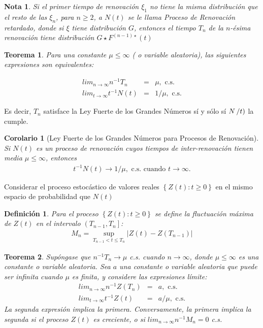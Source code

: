 \documentclass{article}
\newtheorem{Def}{Definición}[section]
\newtheorem{Teo}{Teorema}[section]
\newtheorem{Note}{Nota}[section]
\newtheorem{Coro}{Corolario}[section]
\numberwithin{equation}{section}
\begin{document}
\begin{Note}
Si el primer tiempo de renovaci\'on $\xi_{1}$ no tiene la misma distribuci\'on que el resto de las $\xi_{n}$, para $n\geq2$, a $N\left(t\right)$ se le llama Proceso de Renovaci\'on retardado, donde si $\xi$ tiene distribuci\'on $G$, entonces el tiempo $T_{n}$ de la $n$-\'esima renovaci\'on tiene distribuci\'on $G\star F^{\left(n-1\right)\star}\left(t\right)$
\end{Note}


\begin{Teo}
Para una constante $\mu\leq\infty$ ( o variable aleatoria), las siguientes expresiones son equivalentes:

\begin{eqnarray}
lim_{n\rightarrow\infty}n^{-1}T_{n}&=&\mu,\textrm{ c.s.}\\
lim_{t\rightarrow\infty}t^{-1}N\left(t\right)&=&1/\mu,\textrm{ c.s.}
\end{eqnarray}
\end{Teo}


Es decir, $T_{n}$ satisface la Ley Fuerte de los Grandes N\'umeros s\'i y s\'olo s\'i $N\left/t\right)$ la cumple.


\begin{Coro}[Ley Fuerte de los Grandes N\'umeros para Procesos de Renovaci\'on]
Si $N\left(t\right)$ es un proceso de renovaci\'on cuyos tiempos de inter-renovaci\'on tienen media $\mu\leq\infty$, entonces
\begin{eqnarray}
t^{-1}N\left(t\right)\rightarrow 1/\mu,\textrm{ c.s. cuando }t\rightarrow\infty.
\end{eqnarray}

\end{Coro}


Considerar el proceso estoc\'astico de valores reales $\left\{Z\left(t\right):t\geq0\right\}$ en el mismo espacio de probabilidad que $N\left(t\right)$

\begin{Def}
Para el proceso $\left\{Z\left(t\right):t\geq0\right\}$ se define la fluctuaci\'on m\'axima de $Z\left(t\right)$ en el intervalo $\left(T_{n-1},T_{n}\right]$:
\begin{eqnarray*}
M_{n}=\sup_{T_{n-1}<t\leq T_{n}}|Z\left(t\right)-Z\left(T_{n-1}\right)|
\end{eqnarray*}
\end{Def}

\begin{Teo}
Sup\'ongase que $n^{-1}T_{n}\rightarrow\mu$ c.s. cuando $n\rightarrow\infty$, donde $\mu\leq\infty$ es una constante o variable aleatoria. Sea $a$ una constante o variable aleatoria que puede ser infinita cuando $\mu$ es finita, y considere las expresiones l\'imite:
\begin{eqnarray}
lim_{n\rightarrow\infty}n^{-1}Z\left(T_{n}\right)&=&a,\textrm{ c.s.}\\
lim_{t\rightarrow\infty}t^{-1}Z\left(t\right)&=&a/\mu,\textrm{ c.s.}
\end{eqnarray}
La segunda expresi\'on implica la primera. Conversamente, la primera implica la segunda si el proceso $Z\left(t\right)$ es creciente, o si $lim_{n\rightarrow\infty}n^{-1}M_{n}=0$ c.s.
\end{Teo}
\end{document}
